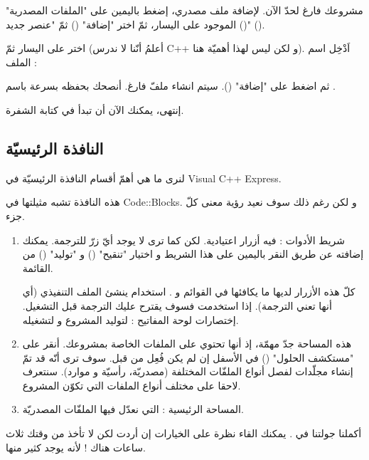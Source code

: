 مشروعك فارغ لحدّ الآن. لإضافة ملف مصدري، إضغط باليمين على
"الملفات المصدرية"
()
الموجود على اليسار، ثمّ اختر
"إضافة"
()
ثمّ
"عنصر جديد"
().


اختر
على اليسار ثمّ
(أعلمُ أنّنا لا ندرس
\textenglish{C++}
و لكن ليس لهذا أهميّة هنا). اَدْخِل اسم الملف :


ثم اضغط على
"إضافة"
().
سيتم انشاء ملفّ فارغ. أنصحك بحفظه بسرعة باسم
.

إنتهى، يمكنك الآن أن تبدأ في كتابة الشفرة.

\subsection{النافذة الرئيسيّة}

لنرى ما هي أهمّ أقسام النافذة الرئيسيّة في
\textenglish{Visual C++ Express}.


هذه النافذة تشبه مثيلتها في
\textenglish{Code::Blocks}.
و لكن رغم ذلك سوف نعيد رؤية معنى كلّ جزء.

\begin{enumerate}
  \item شريط الأدوات : فيه أزرار اعتيادية. لكن كما ترى لا يوجد أيّ زرّ للترجمة. يمكنك إضافته عن طريق النقر باليمين على هذا الشريط و اختيار
"تنقيح"
()
و
"توليد"
()
من القائمة.

كلّ هذه الأزرار لديها ما يكافئها في القوائم
و
.
استخدام
ينشئ الملف التنفيذي (أي أنها تعني الترجمة). إذا استخدمت
فسوف يقترح عليك الترجمة قبل التشغيل. إختصارات لوحة المفاتيح :
لتوليد المشروع و
لتشغيله.
  \item هذه المساحة جدّ مهمّة، إذ أنها تحتوي على الملفات الخاصة بمشروعك. أنقر على
"مستكشف الحلول"
()
في الأسفل إن لم يكن فُعِل من قبل. سوف ترى أنّه قد تمّ إنشاء مجلّدات لفصل أنواع الملفّات المختلفة (مصدريّة، رأسيّة و موارد). سنتعرف لاحقا على مختلف أنواع الملفات التي تكوّن المشروع.
  \item المساحة الرئيسية : التي نعدّل فيها الملفّات المصدريّة.
\end{enumerate}

أكملنا جولتنا في
.
يمكنك القاء نظرة على
الخيارات
إن أردت لكن لا تأخذ من وقتك ثلاث ساعات هناك ! لأنه يوجد كثير منها.
